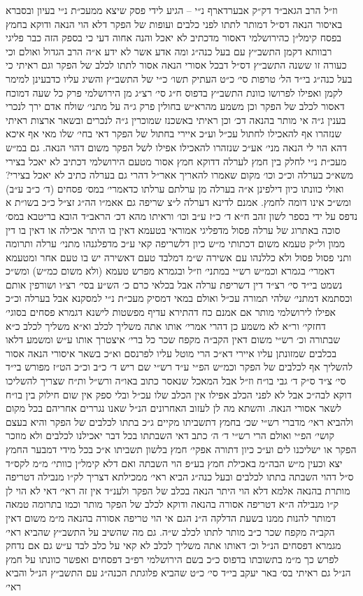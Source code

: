\documentclass[12pt, openany]{book}
\begin{document}
\begin{multicols}{2}
וז״ל הרב הגאב״ד דק״ק אבערדארף נ״י – הגיע לידי פסק שיצא ממעכ״ת נ״י בעיון ובסברא באיסור הנאה דס״ל דמותר לתתו לפני כלבים ועופות של הפקר דלא הוי הנאה ודוקא בחמץ בפסח קימל״ן כהירושלמי דאסור מדכתיב לא יאכל והנה אחוה דעי כי בספק הזה כבר פליגי רבוותא דקמן התשב״ץ עם בעל כנה״ג ומה אדע אשר לא ידע א״ה הרב הגדול ואולם וכי כעורה זו ששנה התשב״ץ דס״ל דבכל אסורי הנאה אסור לתתו לכלב של הפקר וגם ראיתי כי בעל כנה״ג בי״ד הל׳ טרפות סי׳ כ״ט העתיק תשו׳ כ״י של התשב״ץ והשיג עליו כדבעינן למימר לקמן ואפילו לפרושו כוונת התשב״ץ בדפוס ח״ג סי׳ רצ״ג מן הירושלמי פרק כל שעה דמוכח דאסור לכלב של הפקר וכן משמע מהרא״ש בחולין פרק ג״ה על מתני׳ שולח אדם ירך לנכרי בענין ג״ה אי מותר בהנאה דכ׳ וכן ראיתי באשכנז שמוכרין ג״ה לנכרים ובשאר ארצות ראיתי שנזהרו אף להאכילו לחתול עכ״ל וע״כ איירי בחתול של הפקר דאי בחי׳ שלו מאי אף איכא דהא הוי לי הנאה מני׳ אע״כ שנזהרו להאכילו אפילו לשל הפקר משום דהוי הנאה. גם במ״ש מעכ״ת נ״י לחלק בין חמץ לערלה דדוקא חמץ אסור מטעם הירושלמי דכתיב לא יאכל בצירי משא״כ בערלה וכ״כ וכו׳ מקום שאמרו להאריך אאר״ל דהרי גם בערלה כתיב לא יאכל בצירי? ואולי כוונתו כיון דילפינן א״ה בערלה מן ערלתם ערלתו כדאמרי׳ במס׳ פסחים (ד׳ כ״ב ע״ב) ומש״כ אינו דומה לחמץ. אמנם לדינא דערלה ל״צ שריפה גם אאמ״ו הה״ג זצ״ל כ״כ בשו״ת א נדפס על ידי בספר לשון זהב ח״א ד׳ כ״ז ע״ב וכו׳ וראיתו מהא דכ׳ הראב״ד הובא בריטבא במס׳ סוכה באתרוג של ערלה פסול מדפליגי אמוראי בטעמא דאין בו היתר אכילה או דאין בו דין ממון ול״ק טעמא משום דכתותי מ״ש כיון דלשריפה קאי ע״כ מדפלגנהו מתני׳ ערלה ותרומה ותני פסול פסול ולא כללנהו עם אשירה ש״מ דמלבד טעם דאשירה יש בו טעם אחר ומטעמא דאמרי׳ בגמרא וכמ״ש רש״י במתני׳ וז״ל ובגמרא מפרש טעמא (ולא משום כמ״ש) ומש״כ נשמט בי״ד סי׳ רצ״ד דין דשריפת ערלה אבל בכלאי כרם כ׳ הש״ע בסי׳ רצ״ו ושורפין אותם וכסתמא דמתני׳ שלהי תמורה עכ״ל ואולם במאי דמסיק מעכ״ת נ״י למסקנא אבל בערלה וכ״כ אפילו לירושלמי מותר אם אמנם כח דהתירא עדיף מפשטות לישנא דגמרא פסחים בסוגי׳ דחזקי׳ ור״א לא משמע כן דהרי אמרי׳ אותו אתה משליך לכלב וא״א משליך לכלב כ״א שבתורה וכ׳ רש״י משום דאין הקב״ה מקפח שכר כל ברי׳ איצטרך אותו ע״ש ומשמע דלאו בכלבים שמזונתן עליו איירי דא״כ הרי מוטל עליו לפרנסם וא״כ בשאר איסורי הנאה אסור להשליך אף לכלבים של הפקר וכמ״ש הפ״י ע״ד רש״י שם ריש ד׳ כ״ב וכ״כ הט״ז מפורש בי״ד סי׳ צ״ד ס״ק ד׳ גבי בו״ח וז״ל אבל המאכל שנאסר כתוב באו״ה ורש״ל ות״ח שצריך להשליכו דוקא לבה״כ אבל לא לפני הכלב אפילו אין הכלב שלו עכ״ל ובלי ספק אין שום חילוק בין בו״ח לשאר אסורי הנאה. והשתא מה לן לעזוב האחרונים הנ״ל שאנו נגררים אחריהם בכל מקום ולהביא ראי׳ מדברי רש״י שכ׳ בחמץ דתשביתו מקיים ג״כ בתתו לכלבים של הפקר והיא בעצם קושי׳ הפ״י ואולם הרי רש״י ד׳ ה׳ כתב דאי השבתתו בכל דבר יאכילנו לכלבים ולא מוזכר הפקר או ישליכנו לים וע״כ כיון דתורה אפקי׳ חמץ בלשון תשביתו א״כ בכל מידי דמבער החמץ יצא וכעין מ״ש הבה״מ באכילת חמץ בע״פ הוי השבתה ואם דלא קימל״ן כוותי׳ מ״מ לקס״ד ס״ל דהוי השבתה בתתו לכלבים ובעל כנה״ג הביא ראי׳ ממכילתא דצריך לק״ו מנבילה דטריפה מותרת בהנאה אלמא דלא הוי היתר הנאה בכלב של הפקר ולענ״ד אין זה ראי׳ דאי לא הוי לן ק״ו מנבילה ה״א דטריפה אסורה בהנאה ודוקא לכלב של הפקר מותר וכמו בתרומה טמאה דמותר להנות ממנו בשעת הדלקה ה״נ הגם אי הוי טריפה אסורה בהנאה מ״מ משום דאין הקב״ה מקפח שכר כ״ב מותר לתתו לכלב ש״ה. גם מה שהשיב על התשב״ץ שהביא ראי׳ מגמרא דפסחים הנ״ל וכ׳ דאותו אתה משליך לכלב לא קאי על כלב לבד ע״ש גם אם נדחק לפרש כך מ״מ בתשובתו בדפוס כ״כ בשם הירושלמי רפ״ב דפסחים ואפשר כוונתו על חמץ הנ״ל גם ראיתי בס׳ באר יעקב בי״ד סי׳ כ״ט שהביא פלוגתת הכנה״ג עם התשב״ץ הנ״ל והביא ראי׳ 
\end{multicols}
\end{document}
